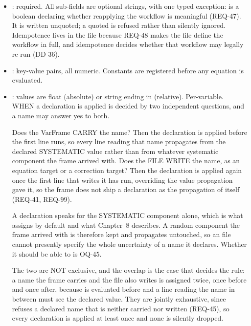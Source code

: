 \begin{itemize}[noitemsep,topsep=2pt]
  \item \code{[meta]}: required. All sub-fields are optional strings,
    with one typed exception:  is a boolean declaring
    whether reapplying the workflow is meaningful (REQ-47). It is
    written unquoted; a quoted  is refused rather than
    silently ignored. Idempotence lives in the file because REQ-48 makes
    the file define the workflow in full, and idempotence decides
    whether that workflow may legally re-run (DD-36).
  \item \code{[constants]}: key-value pairs, all numeric. Constants are
    registered before any equation is evaluated.
  \item \code{[uncertainties]}: values are float (absolute) or string
    ending in  (relative). Per-variable. WHEN a declaration is
    applied is decided by two independent questions, and a name may answer
    yes to both.

    Does the VarFrame CARRY the name? Then the declaration is applied
    before the first line runs, so every line reading that name propagates
    from the declared SYSTEMATIC value rather than from whatever systematic
    component the frame arrived with. Does the FILE WRITE the name, as an
    equation target or a correction target? Then the declaration is applied
    again once the first line that writes it has run, overriding the value
    propagation gave it, so the frame does not ship a declaration as the
    propagation of itself (REQ-41, REQ-99).

    A declaration speaks for the SYSTEMATIC component alone, which is what
     assigns by default and what Chapter~8
    describes. A random component the frame arrived with is therefore kept
    and propagates untouched, so an  file cannot presently
    specify the whole uncertainty of a name it declares. Whether it should
    be able to is OQ-45.

    The two are NOT exclusive, and the overlap is the case that decides
    the rule: a name the frame carries and the file also writes is
    assigned twice, once before and once after, because \code{[equations]}
    is evaluated before \code{[corrections]} and a line reading the name
    in between must see the declared value. They are jointly exhaustive,
    since  refuses a declared name that is neither carried
    nor written (REQ-45), so every declaration is applied at least once
    and none is silently dropped.


\end{itemize}
